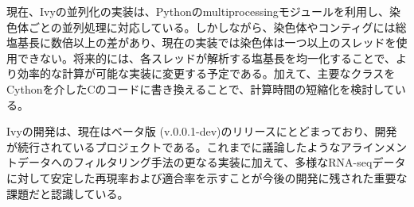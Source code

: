 \par
現在、Ivyの並列化の実装は、Pythonのmultiprocessingモジュールを利用し、染色体ごとの並列処理に対応している。しかしながら、染色体やコンティグには総塩基長に数倍以上の差があり、現在の実装では染色体は一つ以上のスレッドを使用できない。将来的には、各スレッドが解析する塩基長を均一化することで、より効率的な計算が可能な実装に変更する予定である。加えて、主要なクラスをCythonを介したCのコードに書き換えることで、計算時間の短縮化を検討している。
\par
Ivyの開発は、現在はベータ版 (v.0.0.1-dev)のリリースにとどまっており、開発が続行されているプロジェクトである。これまでに議論したようなアラインメントデータへのフィルタリング手法の更なる実装に加えて、多様なRNA-seqデータに対して安定した再現率および適合率を示すことが今後の開発に残された重要な課題だと認識している。
